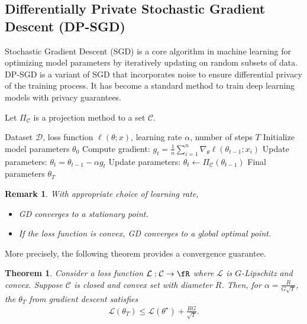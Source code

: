 \documentclass[11pt, a4paper]{article}
\newtheorem{theorem}{Theorem}
\newtheorem{remark}{Remark}
\begin{document}
\subsection{Differentially Private Stochastic Gradient Descent (DP-SGD)}

Stochastic Gradient Descent (SGD) is a core algorithm in machine learning for optimizing model parameters by iteratively updating on random subsets of data. DP-SGD \cite{Abadi2016} is a variant of SGD that incorporates noise to ensure differential privacy of the training process. It has become a standard method to train deep learning models with privacy guarantees.

Let $\Pi_{\mathcal{C}}$ is a projection method to a set $\mathcal{C}$.
\begin{algorithm}[H]
\caption{Gradient Descent (GD)}
\begin{algorithmic}[1]
\REQUIRE Dataset $\mathcal{D}$, loss function $\ell(\theta; x)$, learning rate $\alpha$, number of steps $T$
\STATE Initialize model parameters $\theta_0$
    \STATE Compute gradient: $g_t = \frac{1}{n} \sum_{i=1}^n \nabla_\theta \ell(\theta_{t-1}; x_i)$
    \STATE Update parameters: $\theta_t = \theta_{t-1} - \alpha g_t$
    \STATE Update parameters: $\theta_t \leftarrow \Pi_{\mathcal{C}}(\theta_{t-1})$
\ENDFOR
\RETURN Final parameters $\theta_T$
\end{algorithmic}
\end{algorithm}

\begin{remark}
    With appropriate choice of learning rate,
    \begin{itemize}
        \item GD converges to a stationary point.
        \item If the loss function is convex, GD converges to a global optimal point.
    \end{itemize}
\end{remark}

More precisely, the following theorem provides a convergence guarantee.
\begin{theorem}
    Consider a loss function $\mathcal{L}:\mathcal{C}\rightarrow \fR$ where $\mathcal{L}$ is $G$-Lipschitz and convex.
    Suppose $\mathcal{C}$ is closed and convex set with diameter $R$.
    Then, for $\alpha = \frac{R}{G\sqrt{T}}$, the $\theta_T$ from gradient descent satisfies
    \begin{align}
        \mathcal{L}(\theta_T) \leq \mathcal{L}(\theta^\star) + \frac{RG}{\sqrt{T}}.
    \end{align}
\end{theorem}
\end{document}
